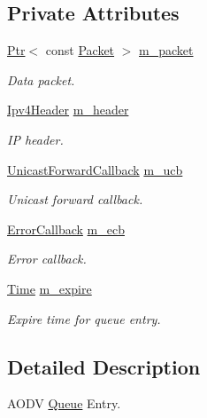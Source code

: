 \subsection*{Private Attributes}
\begin{DoxyCompactItemize}
\item 
\hyperlink{classns3_1_1Ptr}{Ptr}$<$ const \hyperlink{classns3_1_1Packet}{Packet} $>$ \hyperlink{classns3_1_1aodv_1_1QueueEntry_a2d7b3b53e292d6a95a42234b9f0d86c5}{m\+\_\+packet}
\begin{DoxyCompactList}\small\item\em Data packet. \end{DoxyCompactList}\item 
\hyperlink{classns3_1_1Ipv4Header}{Ipv4\+Header} \hyperlink{classns3_1_1aodv_1_1QueueEntry_a13154eeec0f1a300a6730875d304733e}{m\+\_\+header}
\begin{DoxyCompactList}\small\item\em IP header. \end{DoxyCompactList}\item 
\hyperlink{classns3_1_1aodv_1_1QueueEntry_ac0f936aaa2d2de7ba253755b56cecc65}{Unicast\+Forward\+Callback} \hyperlink{classns3_1_1aodv_1_1QueueEntry_a8a5004adc9896b80d3a844ab6d76f95e}{m\+\_\+ucb}
\begin{DoxyCompactList}\small\item\em Unicast forward callback. \end{DoxyCompactList}\item 
\hyperlink{classns3_1_1aodv_1_1QueueEntry_a0a8a6e41579672fb47dc7c9c7cbaf528}{Error\+Callback} \hyperlink{classns3_1_1aodv_1_1QueueEntry_a95bcca4ed5e229b29604c869e36a62ab}{m\+\_\+ecb}
\begin{DoxyCompactList}\small\item\em Error callback. \end{DoxyCompactList}\item 
\hyperlink{classns3_1_1Time}{Time} \hyperlink{classns3_1_1aodv_1_1QueueEntry_aeb63cecd46c78f97879214b35decabd3}{m\+\_\+expire}
\begin{DoxyCompactList}\small\item\em Expire time for queue entry. \end{DoxyCompactList}\end{DoxyCompactItemize}


\subsection{Detailed Description}
A\+O\+DV \hyperlink{classns3_1_1Queue}{Queue} Entry. 

